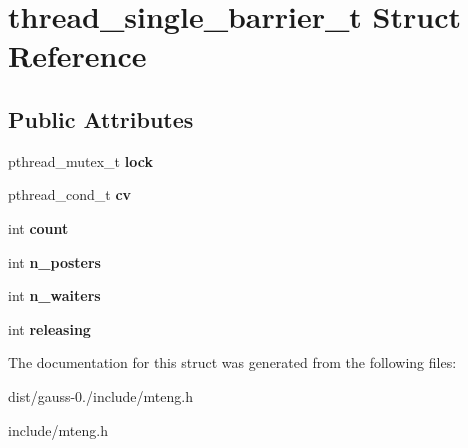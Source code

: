 \hypertarget{structthread__single__barrier__t}{\section{thread\-\_\-single\-\_\-barrier\-\_\-t Struct Reference}
\label{structthread__single__barrier__t}
}
\subsection*{Public Attributes}
\begin{DoxyCompactItemize}
\item 
\hypertarget{structthread__single__barrier__t_af438c2499686e47c1653df340c4387f3}{pthread\-\_\-mutex\-\_\-t {\bfseries lock}}\label{structthread__single__barrier__t_af438c2499686e47c1653df340c4387f3}

\item 
\hypertarget{structthread__single__barrier__t_a0fd873e912ac1976f627b3e6a813f192}{pthread\-\_\-cond\-\_\-t {\bfseries cv}}\label{structthread__single__barrier__t_a0fd873e912ac1976f627b3e6a813f192}

\item 
\hypertarget{structthread__single__barrier__t_a5db53da7782f2658ed5588bfdbb1e733}{int {\bfseries count}}\label{structthread__single__barrier__t_a5db53da7782f2658ed5588bfdbb1e733}

\item 
\hypertarget{structthread__single__barrier__t_a658216dc79c9bf491163315de47a3670}{int {\bfseries n\-\_\-posters}}\label{structthread__single__barrier__t_a658216dc79c9bf491163315de47a3670}

\item 
\hypertarget{structthread__single__barrier__t_a22aa75df9ff4bc747590e6ac91331b13}{int {\bfseries n\-\_\-waiters}}\label{structthread__single__barrier__t_a22aa75df9ff4bc747590e6ac91331b13}

\item 
\hypertarget{structthread__single__barrier__t_aaa104809b4dde4c8c7e32b9bf4041b1e}{int {\bfseries releasing}}\label{structthread__single__barrier__t_aaa104809b4dde4c8c7e32b9bf4041b1e}

\end{DoxyCompactItemize}


The documentation for this struct was generated from the following files\-:\begin{DoxyCompactItemize}
\item 
dist/gauss-\/0./include/mteng.\-h\item 
include/mteng.\-h\end{DoxyCompactItemize}

